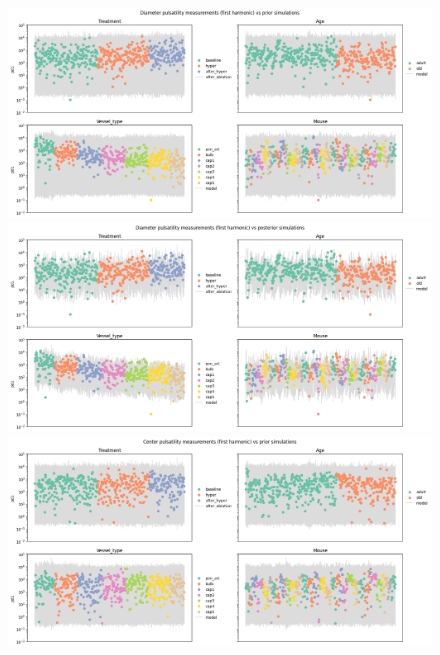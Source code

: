 \documentclass[
  letterpaper,
  DIV=11,
  numbers=noendperiod,
  oneside]{scrartcl}
\theoremstyle{plain}
\theoremstyle{remark}
\begin{document}
\begin{figure}

\begin{minipage}{\linewidth}
\includegraphics{../plots/pulsatility-prior-check-diameter.png}\end{minipage}%
\newline
\begin{minipage}{\linewidth}
\includegraphics{../plots/pulsatility-posterior-check-diameter.png}\end{minipage}%
\newline
\begin{minipage}{\linewidth}
\includegraphics{../plots/pulsatility-prior-check-center.png}\end{minipage}%

\end{figure}
\end{document}
